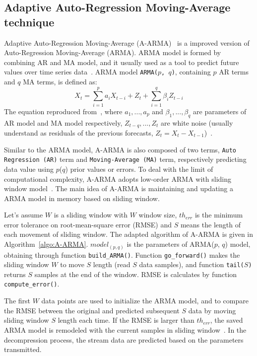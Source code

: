 \subsection{Adaptive Auto-Regression Moving-Average technique}


Adaptive Auto-Regression Moving-Average (A-ARMA)~\cite{lu2010optimized} is a
improved version of Auto-Regression Moving-Average (ARMA). ARMA model is formed
by combining AR and MA model, and it usually used as  a tool to predict future
values over time series data~\cite{chatfield2016analysis}. ARMA model
\texttt{ARMA($p$, $q$)}, containing $p$ AR terms and $q$ MA terms, is defined
as:
\begin{equation}
X_t = \sum_{i=1}^{p}a_{i}X_{t-i} + Z_t + \sum_{i=1}^{q}\beta_{i}Z_{t-i}
\end{equation}
\noindent The equation reproduced from~\cite{chatfield2016analysis}, where 
$a_1, ..., a_p$ and $\beta_1, ..., \beta_q$ are parameters of AR model and MA
model respectively, $Z_{t-q}, ...,Z_{t}$ are white noise (usually understand as
residuals of the previous forecasts, $Z_t = X_t -
X_{t-1}$)~\cite{chatfield2016analysis}.

Similar to the ARMA model, A-ARMA is also composed of
two terms, \texttt{Auto Regression (AR)} term and \texttt{Moving-Average (MA)}
term, respectively predicting data value using $p$($q$) prior values or errors. 
To deal with the limit of computational complexity, A-ARMA adopts low-order ARMA
with sliding window model~\cite{lu2010optimized}. The main idea of A-ARMA is
maintaining and updating a ARMA model in memory based on sliding window. 

Let's assume $W$ is a sliding window with $W$ window size, $th_{err}$ is the
minimum error tolerance on root-mean-square error (RMSE) and $S$ means the
length of each movement of sliding window. The adapted algorithm of A-ARMA is
given in Algorithm~\ref{algo:A-ARMA}. $model_{(p, q)}$ is the parameters of
ARMA($p$, $q$) model, obtaining through function \texttt{build\_ARMA()}.
Function \texttt{go\_forward()} makes the sliding window $W$ to move $S$ length
(read $S$ data samples), and function \texttt{tail($S$)} returns $S$ samples at
the end of the window. RMSE is calculates by function \texttt{compute\_error()}.

The first $W$ data points are used to initialize the ARMA model, and to compare
the RMSE between the original and predicted subsequent $S$ data by moving
sliding window $S$ length each time. If the RMSE is larger than $th_{err}$, the
saved ARMA model is remodeled with the current samples in sliding
window~\cite{lu2010optimized}.
In the decompression process, the stream data are predicted based on the
parameters transmitted.

